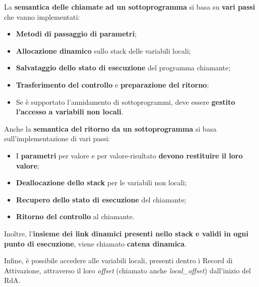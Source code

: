 \documentclass[a4paper]{article}
\begin{document}
 	La \textcolor{Red3}{\textbf{semantica delle chiamate}} \textbf{ad un sottoprogramma} si basa su \textbf{vari passi} che vanno implementati:
 	\begin{itemize}
 		\item \textbf{Metodi di passaggio di parametri};
 		
 		\item \textbf{Allocazione dinamico} sullo stack delle variabili locali;
 		
 		\item \textbf{Salvataggio dello stato di esecuzione} del programma chiamante;
 		
 		\item \textbf{Trasferimento del controllo} e \textbf{preparazione del ritorno};
 		
 		\item Se è supportato l'annidamento di sottoprogrammi, deve essere \textbf{gestito l'accesso a variabili non locali}.
 	\end{itemize}
 	Anche la \textcolor{Red3}{\textbf{semantica del ritorno}} \textbf{da un sottoprogramma} si basa sull'implementazione di vari passi:
 	\begin{itemize}
 		\item I \textbf{parametri} per valore e per valore-risultato \textbf{devono restituire il loro valore};
 		
 		\item \textbf{Deallocazione dello stack} per le variabili non locali;
 		
 		\item \textbf{Recupero dello stato di esecuzione} del chiamante;
 		
 		\item \textbf{Ritorno del controllo} al chiamante.
 	\end{itemize}
 	Inoltre, l'\textbf{insieme dei link dinamici presenti nello stack e validi in ogni punto di esecuzione}, viene chiamato \textcolor{Red3}{\textbf{catena dinamica}}.\newline
 	
 	\noindent
 	Infine, è possibile accedere alle variabili locali, presenti dentro i Record di Attivazione, attraverso il loro \emph{offset} (chiamato anche \emph{local\_offset}) dall'inizio del RdA.\newline
 	
\end{document}
